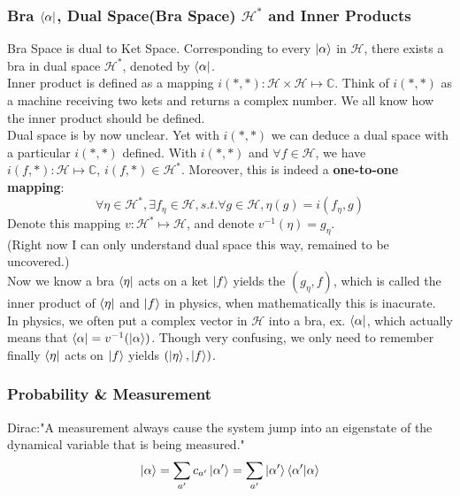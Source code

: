 \documentclass[a4paper, 11pt]{article}
\begin{document}
\subsubsection{Bra $\bra{\alpha}$, Dual Space(Bra Space) $\mathcal{H}^*$ and Inner Products}
Bra Space is dual to Ket Space. Corresponding to every $\ket{\alpha}$ in $\mathcal{H}$, there exists a bra in dual space $\mathcal{H}^*$, denoted by $\bra{\alpha}$.\\
\indent Inner product is defined as a mapping $i(*, *): \mathcal{H}\times\mathcal{H} \mapsto \mathbb{C}$. Think of $i(*, *)$ as a machine receiving two kets and returns a complex number. We all know how the inner product should be defined.\\
\indent Dual space is by now unclear. Yet with $i(*, *)$ we can deduce a dual space with a particular $i(*, *)$ defined. With $i(*, *)$ and $\forall f \in \mathcal{H}$, we have $i(f, *): \mathcal{H} \mapsto \mathbb{C}$, $i(f, *) \in \mathcal{H}^*$. Moreover, this is indeed a \textbf{one-to-one mapping}:
\begin{equation}
\forall \eta \in \mathcal{H}^*, \exists f_{\eta} \in \mathcal{H}, s.t. \forall g \in \mathcal{H}, \eta(g) = i(f_{\eta}, g)
\end{equation}
\indent Denote this mapping $v: \mathcal{H}^* \mapsto \mathcal{H}$, and denote $v^{-1}(\eta) = g_{\eta}$. \\
(Right now I can only understand dual space this way, remained to be uncovered.)\\
\indent Now we know a bra $\bra{\eta}$ acts on a ket $\ket{f}$ yields the $(g_{\eta}, f)$, which is called the inner product of $\bra{\eta}$ and $\ket{f}$ in physics, when mathematically this is inacurate.\\
\indent In physics, we often put a complex vector in $\mathcal{H}$ into a bra, ex. $\bra{\alpha}$, which actually means that $\bra{\alpha} = v^{-1}(\ket{\alpha})$. Though very confusing, we only need to remember finally $\bra{\eta}$ acts on $\ket{f}$ yields $(\ket{\eta}, \ket{f})$.

\subsubsection{Probability \& Measurement}
Dirac:"A measurement always cause the system jump into an eigenstate of the dynamical variable that is being measured."\\
\begin{equation}
 \ket{\alpha} = \sum_{a'}c_{a'}\ket{\alpha'} = \sum_{a'}\ket{\alpha'}\braket{\alpha'|\alpha}
\end{equation}
\end{document}
